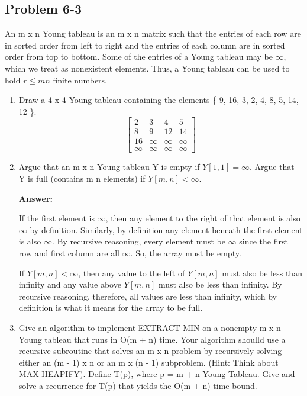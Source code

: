 \documentclass[]{book}
\theoremstyle{definition}
\begin{document}
\subsection*{Problem 6-3}
An m x n Young tableau is an m x n matrix such that the entries of each row are in sorted order from
left to right and the entries of each column are in sorted order from top to bottom. Some of the entries of a Young
tableau may be $\infty$, which we treat as nonexistent elements. Thus, a Young tableau can be used to hold 
$r \leq m n$ finite numbers.


\begin{enumerate}
    \item Draw a 4 x 4 Young tableau containing the elements \{ 9, 16, 3, 2, 4, 8, 5, 14, 12 \}.
    \[
        \begin{bmatrix}
        2  & 3 & 4    & 5  \\
        8  & 9 & 12   & 14 \\
        16 & \infty & \infty    & \infty  \\
        \infty  & \infty & \infty    & \infty
        \end{bmatrix}
    \]

    \item Argue that an m x n Young tableau Y is empty if $Y[1, 1] = \infty$. Argue that Y is full
          (contains m n elements) if $Y[m, n] < \infty$.

    \textbf{Answer:}
    
          If the first element is $\infty$, then any element to the right of that element is also $\infty$
          by definition. Similarly, by definition any element beneath the first element is also $\infty$.
          By recursive reasoning, every element must be $\infty$ since the first row and first column are
          all $\infty$. So, the array must be empty.

          If $Y[m, n] < \infty$, then any value to the left of $Y[m, n]$ must also be less than infinity
          and any value above $Y[m, n]$ must also be less than infinity. By recursive reasoning, 
          therefore, all values are less than infinity, which by definition is what it means for 
          the array to be full.

    \item Give an algorithm to implement EXTRACT-MIN on a nonempty m x n Young tableau that runs in
          O(m + n) time. Your algorithm shoulld use a recursive subroutine that solves an m x n problem by recursively
          solving either an (m - 1) x n or an m x (n - 1) subproblem. (Hint: Think about MAX-HEAPIFY).
          Define T(p), where p = m + n Young Tableau. Give and solve a recurrence for T(p) that yields the O(m + n)
          time bound.


\end{enumerate}
\end{document}
